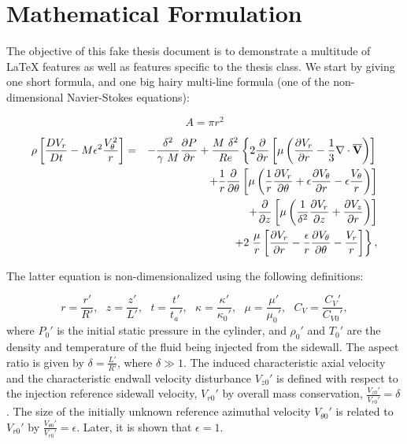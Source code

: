 \chapter{Mathematical Formulation}
\label{mathchapter}

The objective of this fake thesis document is to demonstrate
a multitude of \LaTeX{} features as well as features specific
to the thesis class.
We start by giving one short formula,
and one big hairy multi-line formula
(one of the non-dimensional Navier-Stokes equations):


\begin{equation}
	A = \pi r^2
\end{equation}


\begin{eqnarray}
  \rho \left[ \frac{DV_r}{Dt} - M \epsilon^2
    \frac{V_{\theta}^2}{r} \right]
  & = & -\frac{\delta^2}{\gamma~ M} \frac{\partial P}{\partial r}
	+ \frac{M ~\delta^2}{Re} \left\{ 2 \frac{\partial }{\partial r}
	\left[ \mu \left( \frac{\partial V_r}{\partial r}
        - \frac{1}{3} {\bf \nabla \cdot \overline{V}}
      \right) \right] \right. \nonumber \\
  & & + \frac{1}{r} \frac{\partial }{\partial \theta} \left[ \mu \left(
      \frac{1}{r} \frac{\partial V_r}{\partial \theta} + \epsilon \frac{\partial V_{\theta}}{\partial r}
      - \epsilon \frac{V_{\theta}}{r} \right) \right] \nonumber \\
  & & + \frac{\partial }{\partial z} \left[ \mu \left( \frac{1}{\delta^2}
        \frac{\partial V_r}{\partial z} + \frac{\partial V_z}{\partial r} \right) \right] \nonumber \\
  & & + 2 \left. \frac{\mu}{r}\left[ \frac{\partial V_r}{\partial r} -\frac{\epsilon}{r}
      \frac{\partial V_{\theta}}{\partial \theta} - \frac{V_r}r\right] \right\}, \label{eq:rmom}
\end{eqnarray}


The latter equation is non-dimensionalized using the following definitions:

\[
	r = \frac{r'}{R'}, ~~~
	z = \frac{z'}{L'},~~~
	t = \frac{t'}{t_a'}, ~~~
	\kappa = \frac{\kappa'}{\kappa_0'}, ~~~
	\mu = \frac{\mu'}{\mu_0'} , ~~~
	C_V = \frac{C_V'}{C_{V0}'},
\]
where $P_0'$ is the initial static pressure in the cylinder,
and $\rho_0'$ and $T_0'$ are the density and temperature
of the fluid being injected from the sidewall.
The aspect ratio is given by $\delta = \frac{L'}{R'}$,
where $\delta \gg 1$.
The induced characteristic axial velocity and the characteristic
endwall velocity disturbance $V_{z0}'$ is defined with respect
to the injection reference sidewall velocity,
$V_{r0}'$ by overall mass conservation,
$\frac{V_{z0}'}{V_{r0}'} = \delta$.
The size of the initially unknown reference
azimuthal velocity $V_{\theta 0}'$ is related to
$V_{r0}'$ by $\frac{V_{\theta 0}'}{V_{r0}'}=\epsilon$.
Later, it is shown that $\epsilon=1$.

